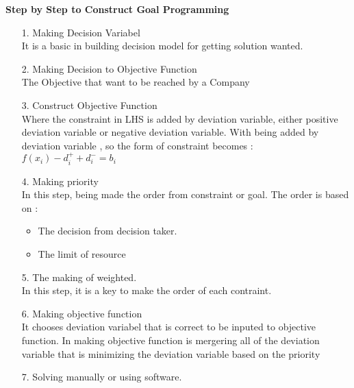 \documentclass[a4paper, 12pt]{article}
\numberwithin{lemma}{section}
\begin{document}
		\textbf{Step by Step to Construct Goal Programming}
		\begin{itemize}
			\item[1. ] Making Decision Variabel\\
			It is a basic in building decision model for getting solution wanted. 
			
			\item[2. ] Making Decision to Objective Function\\
			The Objective that want to be reached by a Company
			
			\item[3. ] Construct Objective Function\\
			Where the constraint in LHS is added by deviation variable, either positive deviation variable or negative deviation variable. With being added by deviation variable , so the form of constraint becomes :
			$f(x_i)-d^+_i+d^-_i = b_i$
			
			\item[4. ] Making priority\\In this step, being made the order from constraint or goal. The order is based on :
			\begin{itemize}
				\item The decision from decision taker.
				\item The limit of resource
			\end{itemize}
		
			\item[5. ] The making of weighted.\\ In this step, it is a key to make the order of each contraint.
			
			\item[6. ] Making objective function\\
			It chooses deviation variabel that is correct to be inputed to objective function. In making objective function is mergering all of the deviation variable that is minimizing the deviation variable based on the priority
			
			\item[7. ] Solving manually or using software.
		\end{itemize}
		
		
\end{document}
